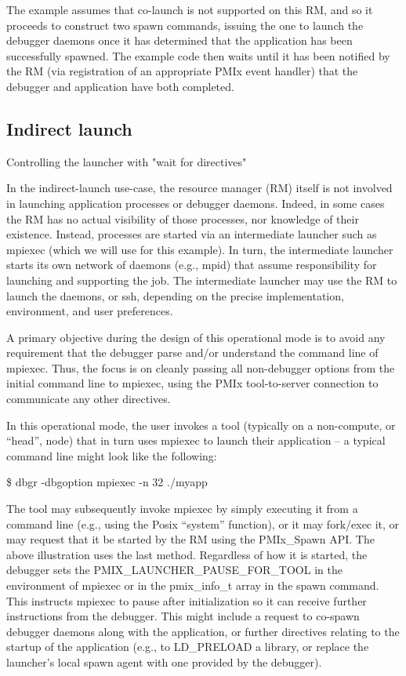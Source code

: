 The example assumes that co-launch is not supported on this RM, and so it proceeds to construct two spawn commands, issuing the one to launch the debugger daemons once it has determined that the application has been successfully spawned. The example code then waits until it has been notified by the RM (via registration of an appropriate PMIx event handler) that the debugger and application have both completed.


\subsection{Indirect launch}


Controlling the launcher with "wait for directives"

In the indirect-launch use-case, the resource manager (RM) itself is not involved in launching application processes or debugger daemons. Indeed, in some cases the RM has no actual visibility of those processes, nor knowledge of their existence. Instead, processes are started via an intermediate launcher such as mpiexec (which we will use for this example). In turn, the intermediate launcher starts its own network of daemons (e.g., mpid) that assume responsibility for launching and supporting the job. The intermediate launcher may use the RM to launch the daemons, or ssh, depending on the precise implementation, environment, and user preferences.

A primary objective during the design of this operational mode is to avoid any requirement that the debugger parse and/or understand the command line of mpiexec. Thus, the focus is on cleanly passing all non-debugger options from the initial command line to mpiexec, using the PMIx tool-to-server connection to communicate any other directives.

In this operational mode, the user invokes a tool (typically on a non-compute, or “head”, node) that in turn uses mpiexec to launch their application – a typical command line might look like the following:


\$ dbgr -dbgoption mpiexec -n 32 ./myapp

The tool may subsequently invoke mpiexec by simply executing it from a command line (e.g., using the Posix “system” function), or it may fork/exec it, or may request that it be started by the RM using the PMIx_Spawn API. The above illustration uses the last method. Regardless of how it is started, the debugger sets the PMIX_LAUNCHER_PAUSE_FOR_TOOL in the environment of mpiexec or in the pmix_info_t array in the spawn command. This instructs mpiexec to pause after initialization so it can receive further instructions from the debugger. This might include a request to co-spawn debugger daemons along with the application, or further directives relating to the startup of the application (e.g., to LD_PRELOAD a library, or replace the launcher’s local spawn agent with one provided by the debugger).

